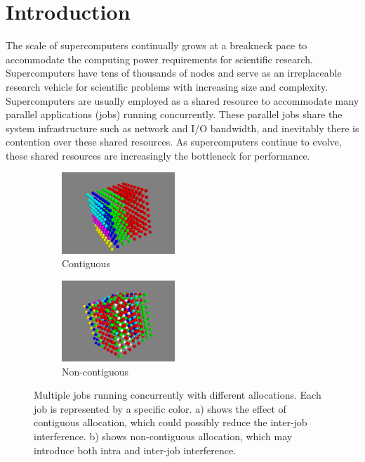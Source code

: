
\section{Introduction} 
\label{sec: intro}

The scale of supercomputers continually grows at a breakneck pace to 
accommodate the computing power requirements for scientific research. 
Supercomputers have tens of thousands of nodes and serve as an irreplaceable 
research vehicle for scientific problems with increasing size and complexity. 
Supercomputers are usually employed as a shared resource to 
accommodate many parallel applications (jobs) running concurrently. 
These parallel jobs share the system infrastructure such as network and I/O bandwidth, 
and inevitably there is contention over these shared resources. 
As supercomputers continue to evolve, these shared resources are increasingly the bottleneck for performance.


\begin{figure}[h!]
    \centering
    \begin{subfigure}[t]{0.22\textwidth}
        \centering
        \includegraphics[height=1.2in]{figs/goodallocation}
        \caption{Contiguous}
        \label{fig:overview_sub1}
    \end{subfigure}%
    \hspace{1em}%
    \begin{subfigure}[t]{0.22\textwidth}
        \centering
        \includegraphics[height=1.2in]{figs/badallocation}
        \caption{Non-contiguous}
        \label{fig:overview_sub2}
    \end{subfigure}%
   \caption{Multiple jobs running concurrently with different allocations. 
   Each job is represented by a specific color. 
   a) shows the effect of contiguous allocation, 
   which could possibly reduce the inter-job interference. 
   b) shows non-contiguous allocation, 
   which may introduce both intra and inter-job interference. 
   }
   \label{fig:overview}
\end{figure}

